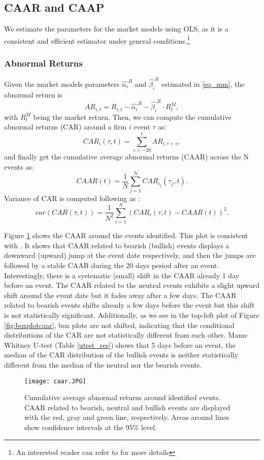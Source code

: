 \subsection{CAAR and CAAP}
We estimate the parameters for the market models using OLS, as it is a consistent and efficient estimator under general conditions.\footnote{An interested reader can refer to \citet{mackinlay1997event} for more details} 

\subsubsection{Abnormal Returns}
Given the market models parameters $\hat{\alpha_i}^R$ and $\hat{\beta_i}^R$ estimated in \eqref{eq_mm}, the abnormal return is
\[     AR_{i,t} = R_{i,t} - \hat{\alpha_i}^R - \hat{\beta_i}^R \cdot R_t^M,\]
with $R_t^M$ being the market return. Then, we can compute the cumulative abnormal returns (CAR) around a firm $i$ event $\tau$ as:
\[    CAR_i(\tau,t) = \sum_{s=- 20}^{t} AR_{i,\tau + s},\]
and finally get the cumulative average abnormal returns (CAAR) across the N events as:
\[     CAAR(t) = \dfrac{1}{N} \sum_{j=1}^N CAR_{i_j}(\tau_j,t).\]
Variance of CAR is computed following \citet{mackinlay1997event} as :
\[     var(CAR(\tau,t)) = \dfrac{1}{N^2} \sum_{i=1}^N (CAR_i(\tau,t) - CAAR(t))^2.\]

Figure \ref{fig:ES_CAAR_MM} shows the CAAR around the events identified. This plot is consistent with \citet{mackinlay1997event}. It shows that CAAR related to bearish (bullish) events displays a downward (upward) jump at the event date respectively, and then the jumps are followed by a stable CAAR during the 20 days period after an event. Interestingly, there is a systematic (small) shift in the CAAR already 1 day before an event. The CAAR related to the neutral events exhibits a slight upward shift around the event date but it fades away after a few days. The CAAR related to bearish events shifts already a few days before the event but this shift is not statistically significant. Additionally, as we see in the top-left plot of Figure \ref{fig:boxplotcaar}, box plots are not shifted, indicating that the conditional distributions of the CAR are not statistically different from each other. Mann-Whitney U-test (Table \ref{utest_res}) shows that 5 days before an event, the median of the CAR distribution of the bullish events is neither statistically different from the median of the neutral nor the bearish events.

\begin{figure}[h]
    \centering
    \texttt{[image: caar.JPG]}
    \caption{Cumulative average abnormal returns around identified events. CAAR related to bearish, neutral and bullish events are displayed with the red, gray and green line, respectively. Areas around lines show confidence intervals at the 95\% level.}
    \label{fig:ES_CAAR_MM}
\end{figure}

